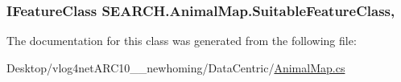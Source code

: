 \hypertarget{class_s_e_a_r_c_h_1_1_animal_map_a5a6d17ff0edb0d49d9b687bb9cceadc0}{
\subsubsection[{Suitable\-Feature\-Class}]{\setlength{\rightskip}{0pt plus 5cm}I\-Feature\-Class S\-E\-A\-R\-C\-H.\-Animal\-Map.\-Suitable\-Feature\-Class\hspace{0.3cm}{\ttfamily [get]}, {\ttfamily [set]}}}\label{class_s_e_a_r_c_h_1_1_animal_map_a5a6d17ff0edb0d49d9b687bb9cceadc0}


The documentation for this class was generated from the following file\-:\begin{DoxyCompactItemize}
\item 
Desktop/vlog4net\-A\-R\-C10\-\_\-\_\-newhoming/\-Data\-Centric/\hyperlink{_animal_map_8cs}{Animal\-Map.\-cs}\end{DoxyCompactItemize}
